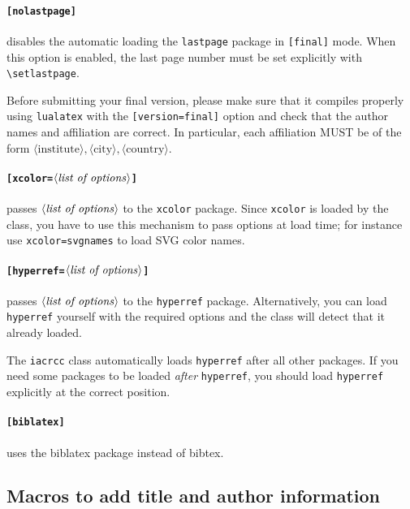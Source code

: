 \documentclass{iacrcc}
\begin{document}
\paragraph{\texttt{[nolastpage]}}
disables the automatic loading the \texttt{lastpage} package in
\texttt{[final]} mode.  When this option is enabled, the last page
number must be set explicitly with
\texttt{\textbackslash{}setlastpage}.

Before submitting your final version, please make sure that it compiles
properly using \texttt{lualatex} with the \texttt{[version=final]} option
and check that the author names and affiliation are
correct.  In particular, each affiliation MUST be of the form
$\langle\text{institute}\rangle, \langle\text{city}\rangle,
\langle\text{country}\rangle$.

\paragraph{\texttt{[xcolor=$\langle\text{\emph{list of options}}\rangle$]}}
passes $\langle\text{\emph{list of options}}\rangle$ to the
\texttt{xcolor} package.  Since \texttt{xcolor} is loaded by the class,
you have to use this mechanism to pass options at load time; for instance
use \texttt{xcolor=svgnames} to load SVG color names.

\paragraph{\texttt{[hyperref=$\langle\text{\emph{list of options}}\rangle$]}}
passes $\langle\text{\emph{list of options}}\rangle$ to the
\texttt{hyperref} package.  Alternatively, you can load
\texttt{hyperref} yourself with the required options and the class will
detect that it already loaded.

The \texttt{iacrcc} class automatically loads \texttt{hyperref}
after all other packages.  If you need some packages to be loaded
\emph{after} \texttt{hyperref}, you should load \texttt{hyperref}
explicitly at the correct position.

\paragraph{\texttt{[biblatex]}} uses the biblatex package instead of bibtex.

\subsection{Macros to add title and author information}
\end{document}
